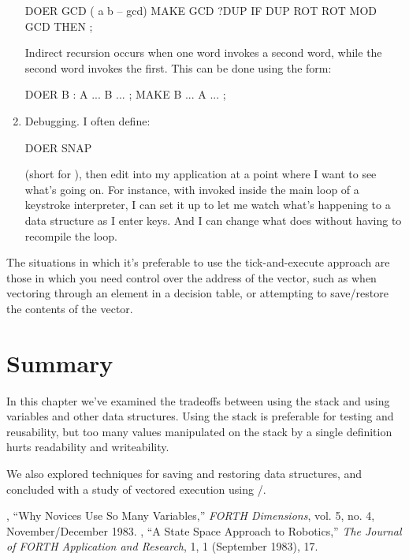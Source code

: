 \begin{enumerate}
\begin{Code}
DOER GCD ( a b -- gcd)
MAKE GCD  ?DUP  IF  DUP ROT ROT  MOD  GCD  THEN ;
\end{Code}
Indirect recursion occurs when one word invokes a second word, while the
second word invokes the first. This can be done using the form:

\begin{Code}
DOER B
: A  ... B ... ;
MAKE B  ... A ... ;
\end{Code}
\item Debugging. I often define:

\begin{Code}
DOER SNAP
\end{Code}
(short for ), then edit  into my
application at a point where I want to see what's going on. For
instance, with  invoked inside the main loop of a
keystroke interpreter, I can set it up to let me watch what's
happening to a data structure as I enter keys. And I can change what
 does without having to recompile the loop.
\end{enumerate}


The situations in which it's preferable to use the tick-and-execute approach
are those in which you need control over the address of the vector,
such as when vectoring through an element in a decision table, or
attempting to save/restore the contents of the vector.

\section{Summary}
In this chapter we've examined the tradeoffs between using the stack
and using variables and other data structures. Using the stack is
preferable for testing and reusability, but too many values manipulated
on the stack by a single definition hurts readability and writeability.

We also explored techniques for saving and restoring data structures,
and concluded with a study of vectored execution using
/.

\begin{references}{9}
 , ``Why Novices Use So Many Variables,''
   \emph{FORTH Dimensions}, vol. 5, no. 4, November/December 1983.
 , ``A State Space Approach to
   Robotics,'' \emph{The Journal of FORTH Application and Research},
   1, 1 (September 1983), 17.
\end{references}

